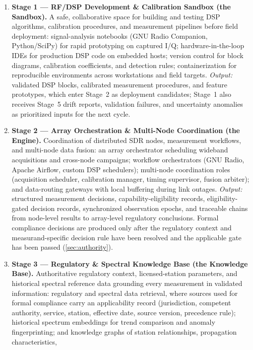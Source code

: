 \documentclass[11pt,a4paper]{article}
\begin{document}
\begin{enumerate}
  \item \textbf{Stage 1 --- RF/DSP Development \& Calibration Sandbox (the Sandbox).} A safe,
    collaborative space for building and testing DSP algorithms, calibration procedures, and
    measurement pipelines before field deployment: signal-analysis notebooks (GNU Radio
    Companion, Python/SciPy) for rapid prototyping on captured I/Q; hardware-in-the-loop IDEs
    for production DSP code on embedded hosts; version control for block diagrams, calibration
    coefficients, and detection rules; containerization for reproducible environments across
    workstations and field targets. \emph{Output:} validated DSP blocks, calibrated measurement
    procedures, and feature prototypes, which enter Stage~2 as deployment candidates; Stage~1
    also receives Stage~5 drift reports, validation failures, and uncertainty anomalies as
    prioritized inputs for the next cycle.
  \item \textbf{Stage 2 --- Array Orchestration \& Multi-Node Coordination (the Engine).}
    Coordination of distributed SDR nodes, measurement workflows, and multi-node data fusion: an
    array orchestrator scheduling wideband acquisitions and cross-node campaigns; workflow
    orchestrators (GNU Radio, Apache Airflow, custom DSP schedulers); multi-node coordination
    roles (acquisition scheduler, calibration manager, timing supervisor, fusion arbiter); and
    data-routing gateways with local buffering during link outages. \emph{Output:} structured
    measurement decisions, capability-eligibility records, eligibility-gated decision records,
    synchronized observation epochs, and traceable chains from node-level results to array-level
    regulatory conclusions. Formal compliance decisions are produced only after the regulatory
    context and measurand-specific decision rule have been resolved and the applicable gate has
    been passed (\cref{sec:authority}).
  \item \textbf{Stage 3 --- Regulatory \& Spectral Knowledge Base (the Knowledge Base).}
    Authoritative regulatory context, licensed-station parameters, and historical spectral
    reference data grounding every measurement in validated information: regulatory and spectral
    data retrieval, where sources used for formal compliance carry an applicability record
    (jurisdiction, competent authority, service, station, effective date, source version,
    precedence rule); historical spectrum embeddings for trend comparison and anomaly
    fingerprinting; and knowledge graphs of station relationships, propagation characteristics,

\end{enumerate}
\end{document}
